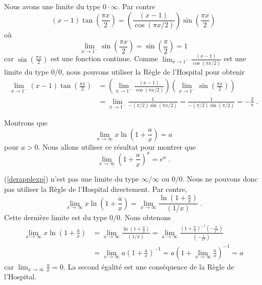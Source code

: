 {\begin{egg}[\eng]
Nous avons une limite du type $0\cdot \infty$.  Par contre
\[
(x-1)\tan\left(\frac{\pi x}{2}\right) =
\left(\frac{(x-1)}{\cos(\pi x/2)}\right)
\sin\left(\frac{\pi x}{2}\right)
\]
où
\[
  \lim_{x\to 1^-} \sin\left(\frac{\pi x}{2}\right) =
  \sin\left(\frac{\pi}{2}\right) = 1
\]
car $\displaystyle \sin\left(\frac{\pi x}{2}\right)$ est une fonction
continue.  Comme
$\displaystyle \lim_{x\to 1^-} \frac{(x-1)}{\cos(\pi x/2)}$
est une limite du type $0/0$, nous pouvons utiliser la Règle de
l'Hospital pour obtenir
\begin{align*}
\lim_{x\rightarrow 1^-} (x-1)\tan\left(\frac{\pi x}{2}\right)
&= \left(\lim_{x\rightarrow 1^-}
\frac{(x-1)}{\cos(\pi x/2)} \right)
\left( \lim_{x\to 1^-} \sin\left(\frac{\pi x}{2}\right) \right)\\
&= \lim_{x\rightarrow 1^-} \frac{1}{-(\pi/2) \sin(\pi x/2)}
= \frac{1}{-(\pi/2) \sin(\pi/2)}
= - \frac{2}{\pi} \; .
\end{align*}
\end{egg}

\begin{egg}[\eng]
Montrons que
\begin{equation} \label{derapplexp}
\lim_{x\rightarrow \infty} x\ln\left(1+\frac{a}{x}\right) = a
\end{equation}
pour $a>0$.  Nous allons utiliser ce résultat pour montrer que
\[
\lim_{x\rightarrow \infty} \left( 1 + \frac{a}{x}\right)^x = e^a \; .
\]

(\ref{derapplexp}) n'est pas une limite du type $\infty/\infty$ ou
$0/0$.  Nous ne pouvons donc pas utiliser la Règle de l'Hospital
directement.  Par contre,
\[
\lim_{x\rightarrow \infty} x\ln\left(1+\frac{a}{x}\right)
= \lim_{x\rightarrow \infty}
\frac{\displaystyle \ln\left(1+\frac{a}{x}\right)}{(1/x)} \; .
\]
Cette dernière limite est du type $0/0$.  Nous obtenons
\begin{align*}
\lim_{x\rightarrow \infty} x\ln\left(1+\frac{a}{x}\right)
&= \lim_{x\rightarrow \infty}
\frac{\displaystyle\ln\left(1+\frac{a}{x}\right)}{(1/x)}
= \lim_{x\rightarrow \infty} \frac{\displaystyle \left(1+\frac{a}{x}\right)^{-1}
\left(-\frac{a}{x^2}\right)}{\displaystyle \left(-\frac{1}{x^2}\right)} \\
&= \lim_{x\rightarrow \infty} a\left(1+\frac{a}{x}\right)^{-1}
= a\left(1+\lim_{x\rightarrow \infty} \frac{a}{x}\right)^{-1} = a
\end{align*}
car $\displaystyle \lim_{x\to \infty} \frac{a}{x} = 0$.  La second
égalité est une conséquence de la Règle de l'Hospital.


\end{egg}}
